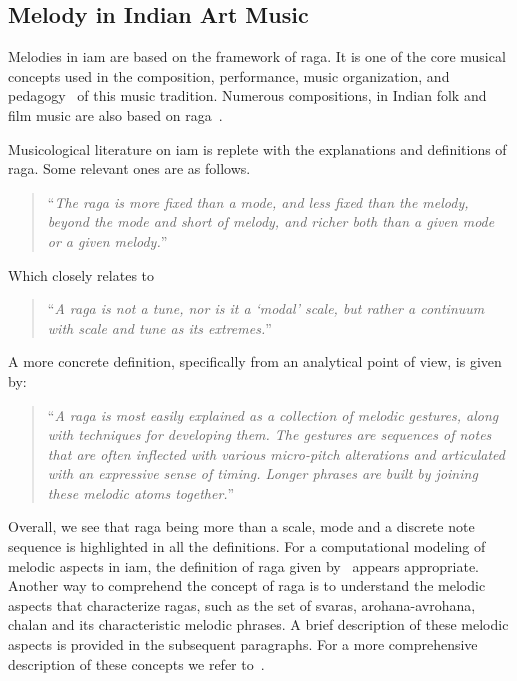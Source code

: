 \subsection{Melody in Indian Art Music}
\label{sec:melody_in_iam}

Melodies in \gls{iam} are based on the framework of \gls{raga}. It is one of the core musical concepts used in the composition, performance, music organization, and pedagogy~\citep{Bagchee1998,Danielou2010} of this music tradition. Numerous compositions, in Indian folk and film music are also based on \gls{raga}~\citep{ganti2013bollywood}.

Musicological literature on \gls{iam} is replete with the explanations and definitions of \gls{raga}. Some relevant ones are as follows.

\blockcquote[p. 96]{martinez2001semiosis}{``\textit{The \gls{raga} is more fixed than a mode, and less fixed than the melody, beyond the mode and short of melody, and richer both than a given mode or a given melody.}''}

Which closely relates to

\blockcquote[]{powers1963background}{``\textit{A \gls{raga} is not a tune, nor is it a `modal' scale, but rather a continuum with scale and tune as its extremes.}''}

A more concrete definition, specifically from an analytical point of view, is given by:

\blockcquote[]{chordia2013joint}{``\textit{A \gls{raga} is most easily explained as a collection of melodic gestures, along with techniques for developing them. The gestures are sequences of notes that are often inflected with various micro-pitch alterations and articulated with an expressive sense of timing. Longer phrases are built by joining these melodic atoms together.}''}

Overall, we see that \gls{raga} being more than a scale, mode and a discrete note sequence is highlighted in all the definitions. For a computational modeling of melodic aspects in \gls{iam}, the definition of \gls{raga} given by~\cite{chordia2013joint} appears appropriate. Another way to comprehend the concept of \gls{raga} is to understand the melodic aspects that characterize \glspl{raga}, such as the set of \glspl{svara}, \gls{arohana}-\gls{avrohana}, \gls{chalan} and its characteristic melodic phrases. A brief description of these melodic aspects is provided in the subsequent paragraphs. For a more comprehensive description of these concepts we refer to~\cite{Danielou2010,Bagchee1998,Viswanathan2004}.

